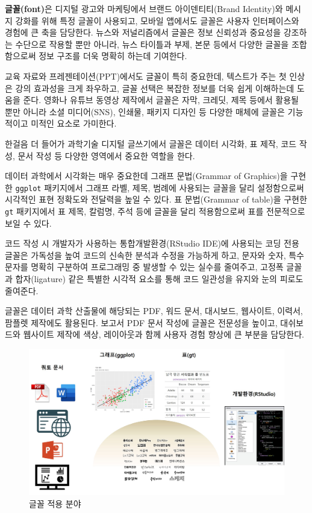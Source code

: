 \documentclass[
  letterpaper,
]{book}
\begin{document}
\textbf{글꼴(font)}은 디지털 광고와 마케팅에서 브랜드 아이덴티티(Brand
Identity)와 메시지 강화를 위해 특정 글꼴이 사용되고, 모바일 앱에서도
글꼴은 사용자 인터페이스와 경험에 큰 축을 담당한다. 뉴스와 저널리즘에서
글꼴은 정보 신뢰성과 중요성을 강조하는 수단으로 작용할 뿐만 아니라, 뉴스
타이틀과 부제, 본문 등에서 다양한 글꼴을 조합함으로써 정보 구조를 더욱
명확히 하는데 기여한다.

교육 자료와 프레젠테이션(PPT)에서도 글꼴이 특히 중요한데, 텍스트가 주는
첫 인상은 강의 효과성을 크게 좌우하고, 글꼴 선택은 복잡한 정보를 더욱
쉽게 이해하는데 도움을 준다. 영화나 유튜브 동영상 제작에서 글꼴은 자막,
크레딧, 제목 등에서 활용될 뿐만 아니라 소셜 미디어(SNS), 인쇄물, 패키지
디자인 등 다양한 매체에 글꼴은 기능적이고 미적인 요소로 가미한다.

한걸음 더 들어가 과학기술 디지털 글쓰기에서 글꼴은 데이터 시각화, 표
제작, 코드 작성, 문서 작성 등 다양한 영역에서 중요한 역할을 한다.

데이터 과학에서 시각화는 매우 중요한데 그래프 문법(Grammar of
Graphics)을 구현한 \texttt{ggplot} 패키지에서 그래프 라벨, 제목, 범례에
사용되는 글꼴을 달리 설정함으로써 시각적인 표현 정확도와 전달력을 높일
수 있다. 표 문법(Grammar of table)을 구현한 \texttt{gt} 패키지에서 표
제목, 칼럼명, 주석 등에 글꼴을 달리 적용함으로써 표를 전문적으로 보일 수
있다.

코드 작성 시 개발자가 사용하는 통합개발환경(RStudio IDE)에 사용되는 코딩
전용 글꼴은 가독성을 높여 코드의 신속한 분석과 수정을 가능하게 하고,
문자와 숫자, 특수문자를 명확히 구분하여 프로그래밍 중 발생할 수 있는
실수를 줄여주고, 고정폭 글꼴과 합자(ligature) 같은 특별한 시각적 요소를
통해 코드 일관성을 유지와 눈의 피로도 줄여준다.

글꼴은 데이터 과학 산출물에 해당되는 PDF, 워드 문서, 대시보드, 웹사이트,
이력서, 팜플렛 제작에도 활용된다. 보고서 PDF 문서 작성에 글꼴은 전문성을
높이고, 대쉬보드와 웹사이트 제작에 색상, 레이아웃과 함께 사용자 경험
향상에 큰 부분을 담당한다.

\begin{figure}

{\centering \includegraphics{images/fonts_application.jpg}

}

\caption{글꼴 적용 분야}

\end{figure}
\end{document}
